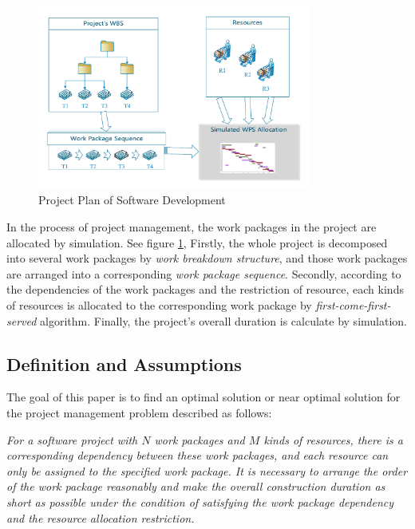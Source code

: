 \begin{figure}[!ht]
  \centering
  \includegraphics[width=0.8\textwidth]{figures/simu.pdf}
  \caption{Project Plan of Software Development}
  \label{fig:simu}
\end{figure}



 In the process of project management, the work packages in the project are
 allocated by simulation. See figure \ref{fig:simu}, Firstly, the whole project
 is decomposed into several work packages by \emph{work breakdown structure},
 and those work packages are arranged into a corresponding \emph{work package
   sequence}. Secondly, according to the dependencies of the work packages and
 the restriction of resource, each kinds of resources is allocated to the
 corresponding work package by \emph{first-come-first-served}
 algorithm. Finally, the project's overall duration is calculate by simulation.



\subsection{Definition and Assumptions}
%
The goal of this paper is to find an optimal solution or near optimal
solution for the project management problem described as follows:


\emph{
  For a software project with $N$ work packages and $M$ kinds of resources,
  there is a corresponding dependency between these work packages, and each
  resource can only be assigned to the specified work package.  It is necessary
  to arrange the order of the work package reasonably and make the overall
  construction duration as short as possible under the condition of satisfying
  the work package dependency and the resource allocation restriction.
}

